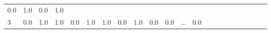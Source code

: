 \documentclass[
  brazilian,
]{article}
\begin{document}
\begin{longtable}[]{@{}llllllllllllllllllllll@{}}
\begin{minipage}[t]{0.02\columnwidth}
0.0\strut
\end{minipage} & \begin{minipage}[t]{0.02\columnwidth}\raggedright
1.0\strut
\end{minipage} & \begin{minipage}[t]{0.03\columnwidth}\raggedright
0.0\strut
\end{minipage} & \begin{minipage}[t]{0.02\columnwidth}\raggedright
1.0\strut
\end{minipage}\tabularnewline
\begin{minipage}[t]{0.01\columnwidth}\raggedright
3\strut
\end{minipage} & \begin{minipage}[t]{0.03\columnwidth}\raggedright
0.0\strut
\end{minipage} & \begin{minipage}[t]{0.04\columnwidth}\raggedright
1.0\strut
\end{minipage} & \begin{minipage}[t]{0.03\columnwidth}\raggedright
1.0\strut
\end{minipage} & \begin{minipage}[t]{0.02\columnwidth}\raggedright
0.0\strut
\end{minipage} & \begin{minipage}[t]{0.02\columnwidth}\raggedright
1.0\strut
\end{minipage} & \begin{minipage}[t]{0.02\columnwidth}\raggedright
1.0\strut
\end{minipage} & \begin{minipage}[t]{0.02\columnwidth}\raggedright
0.0\strut
\end{minipage} & \begin{minipage}[t]{0.03\columnwidth}\raggedright
1.0\strut
\end{minipage} & \begin{minipage}[t]{0.02\columnwidth}\raggedright
0.0\strut
\end{minipage} & \begin{minipage}[t]{0.03\columnwidth}\raggedright
0.0\strut
\end{minipage} & \begin{minipage}[t]{0.02\columnwidth}\raggedright
\ldots{}\strut
\end{minipage} & \begin{minipage}[t]{0.02\columnwidth}\raggedright
0.0\strut
\end{minipage} & \begin{minipage}[t]{0.03\columnwidth}\raggedright

\end{minipage}
\end{longtable}
\end{document}
